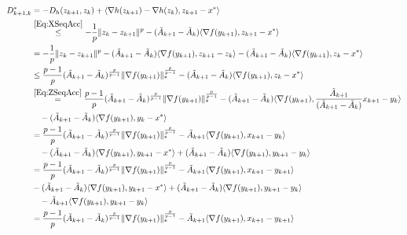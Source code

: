 \documentclass[11pt]{article}
\theoremstyle{plain}
\begin{document}
\begin{subequations}
\begin{align}
D^\ast_{k+1, k} &= -D_h(z_{k+1}, z_k) +  \langle \nabla h(z_{k+1}) - \nabla h(z_k), z_{k+1} - x^\ast\rangle\notag \\
&\overset{\eqref{Eq:XSeqAcc}}{\leq} -\frac{1}{p}\|z_k - z_{k+1}\|^p -(\tilde A_{k+1} -\tilde A_{k}) \langle  \nabla f(y_{k+1}), z_{k+1} - x^\ast\rangle \label{Eq:StrongConvAssump} \\
&= -\frac{1}{p}\|z_k - z_{k+1}\|^p - (\tilde A_{k+1} -\tilde A_{k}) \langle \nabla f(y_{k+1}), z_{k+1} - z_k\rangle -(\tilde A_{k+1} -\tilde A_{k}) \langle  \nabla   f(y_{k+1}), z_k - x^\ast\rangle \notag\\
&\leq\frac{p-1}{p}(\tilde A_{k+1} -\tilde A_{k})^{\frac{p}{p-1}} \|\nabla  f(y_{k+1})\|_\ast^{\frac{p}{p-1}} - (\tilde A_{k+1} -\tilde A_{k}) \langle\nabla  f(y_{k+1}), z_k - x^\ast\rangle \label{Eq:HoldBound}\\
& \overset{\eqref{Eq:ZSeqAcc}}{=}\frac{p-1}{p}(\tilde A_{k+1} -\tilde A_{k})^{\frac{p}{p-1}} \|\nabla f(y_{k+1})\|_\ast^{\frac{p}{p-1}}
 - (\tilde A_{k+1} - \tilde A_k) \langle\nabla  f(y_{k+1}), \frac{\tilde A_{k+1}}{(\tilde A_{k+1} -\tilde A_{k})} x_{k+1} - y_k\rangle\notag \\
& \quad -(\tilde A_{k+1} - \tilde A_k) \langle\nabla  f(y_{k+1}),  y_k - x^\ast\rangle \notag\\
&=\frac{p-1}{p}(\tilde A_{k+1} -\tilde A_{k})^{\frac{p}{p-1}} \|\nabla f(y_{k+1})\|_\ast^{\frac{p}{p-1}}- \tilde A_{k+1} \langle\nabla  f(y_{k+1}), x_{k+1} - y_k\rangle  \notag\\
&\quad- (\tilde A_{k+1} -\tilde A_{k})\langle\nabla  f(y_{k+1}), y_{k+1} - x^\ast\rangle + (\tilde A_{k+1} -\tilde A_{k})\langle \nabla f(y_{k+1}), y_{k+1} - y_k \rangle \notag\\
%
& =\frac{p-1}{p}(\tilde A_{k+1} -\tilde A_{k})^{\frac{p}{p-1}} \|\nabla f(y_{k+1})\|_\ast^{\frac{p}{p-1}}- \tilde A_{k+1} \langle\nabla f(y_{k+1}), x_{k+1} - y_{k+1}\rangle\notag \\
 &- (\tilde A_{k+1} -\tilde A_{k})\langle\nabla  f(y_{k+1}), y_{k+1} - x^\ast\rangle + (\tilde A_{k+1} -\tilde A_{k})\langle \nabla   f(y_{k+1}), y_{k+1} - y_k \rangle \\
 &\quad- \tilde A_{k+1} \langle\nabla   f(y_{k+1}), y_{k+1} - y_{k}\rangle \notag\\
& =\frac{p-1}{p}(\tilde A_{k+1} -\tilde A_{k})^{\frac{p}{p-1}} \|\nabla  f(y_{k+1})\|_\ast^{\frac{p}{p-1}}-\tilde  A_{k+1} \langle\nabla f(y_{k+1}), x_{k+1} - y_{k+1}\rangle \notag\\

\end{align}
\end{subequations}
\end{document}
